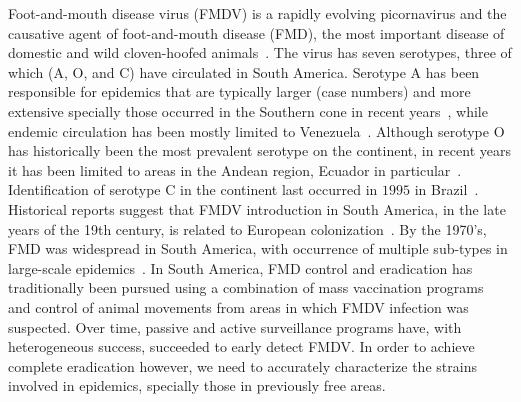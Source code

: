 \documentclass[10pt]{article}
\begin{document}
Foot-and-mouth disease virus (FMDV) is a rapidly evolving picornavirus and the causative agent of foot-and-mouth disease (FMD), the most important disease of domestic and wild cloven-hoofed animals~\cite{review}.
The virus has seven serotypes, three of which (A, O, and C) have circulated in South America.
Serotype A has been responsible for epidemics that are typically larger (case numbers) and more extensive specially those occurred in the 
Southern cone in recent years~\cite{Perez2001, Malirat2012}, while endemic circulation has been mostly limited to Venezuela~\cite{Malirat2012}.
Although serotype O has historically been the most prevalent serotype on the continent, in recent years it has been limited to areas in the Andean region, Ecuador in particular~\cite{andean}.
Identification of serotype C in the continent last occurred in $1995$ in Brazil~\cite{review_eradication}.
Historical reports suggest that FMDV introduction in South America, in the late years of the 19th century, is  related to European colonization~\cite{Naranjo2013, tully}. 
By the 1970's, FMD was widespread in South America, with occurrence of multiple sub-types in large-scale epidemics~\cite{Saraiva2003}.
In South America, FMD control and eradication has traditionally been pursued using a combination of mass vaccination programs~\cite{vaccinationSA} and control of animal movements from areas in which FMDV infection was suspected.
Over time, passive and active surveillance programs have, with heterogeneous success, succeeded to early detect FMDV.
In order to achieve complete eradication however, we need to accurately characterize the strains involved in epidemics, specially those in previously free areas.
\end{document}
